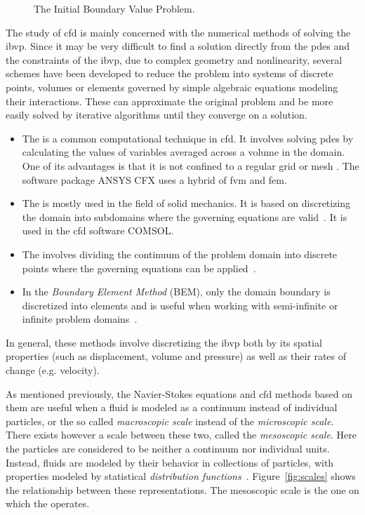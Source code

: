 \begin{figure}[H]
\centering
\begin{small}
\def\svgwidth{1.0\linewidth}

\end{small}
\caption{The Initial Boundary Value Problem.}
\label{fig:ibvp}
\end{figure}

The study of \gls{cfd} is mainly concerned with the numerical methods of solving the \gls{ibvp}. Since it may be very difficult to find a solution directly from the \gls{pde}s and the constraints of the \gls{ibvp}, due to complex geometry and nonlinearity, several schemes have been developed to reduce the problem into systems of discrete points, volumes or elements governed by simple algebraic equations modeling their interactions. These can approximate the original problem and be more easily solved by iterative algorithms until they converge on a solution.
\begin{itemize}
\item The \textit{} is a common computational technique in \gls{cfd}. It involves solving \gls{pde}s by calculating the values of variables averaged across a volume in the domain. One of its advantages is that it is not confined to a regular grid or mesh \cite{wolfram_fvm}.  The software package ANSYS CFX uses a hybrid of \gls{fvm} and \gls{fem}.
\item The \textit{} is mostly used in the field of solid mechanics. It is based on discretizing the domain into subdomains where the governing equations are valid~\cites[pg.7]{notes_on_cm}. It is used in the \gls{cfd} software COMSOL.
\item The \textit{} involves dividing the continuum of the problem domain into discrete points where the governing equations can be applied~\cites[pg.7]{notes_on_cm}.
\item In the \textit{Boundary Element Method} (BEM), only the domain boundary is discretized into elements and is useful when working with semi-infinite or infinite problem domains~\cites[pg.7]{notes_on_cm}.
\end{itemize}
In general, these methods involve discretizing the \gls{ibvp} both by its spatial properties (such as displacement, volume and pressure) as well as their rates of change (e.g. velocity).

As mentioned previously, the Navier-Stokes equations and \gls{cfd} methods based on them are useful when a fluid is modeled as a continuum instead of individual particles, or the so called \textit{macroscopic scale} instead of the \textit{microscopic scale}. There exists however a scale between these two, called the \textit{mesoscopic scale}. Here the particles are considered to be neither a continuum nor individual units. Instead, fluids are modeled by their behavior in collections of particles, with properties modeled by statistical \textit{distribution functions}~\cites[pg.3]{lbm1}. Figure~\ref{fig:scales} shows the relationship between these representations. The mesoscopic scale is the one on which the  operates.

